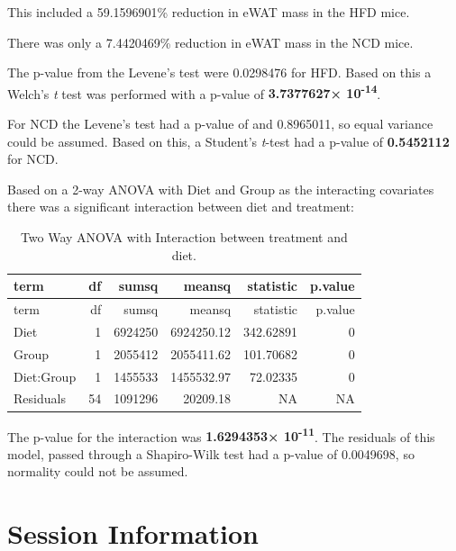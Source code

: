 \documentclass[]{article}
\begin{document}
This included a 59.1596901\% reduction in eWAT mass in the HFD mice.

There was only a 7.4420469\% reduction in eWAT mass in the NCD mice.

The p-value from the Levene's test were 0.0298476 for HFD. Based on this
a Welch's \emph{t} test was performed with a p-value of
\textbf{3.7377627× 10\textsuperscript{-14}}.

For NCD the Levene's test had a p-value of and 0.8965011, so equal
variance could be assumed. Based on this, a Student's \emph{t}-test had
a p-value of \textbf{0.5452112} for NCD.

Based on a 2-way ANOVA with Diet and Group as the interacting covariates
there was a significant interaction between diet and treatment:

\begin{longtable}[]{@{}lrrrrr@{}}
\caption{Two Way ANOVA with Interaction between treatment and
diet.}\tabularnewline
\toprule
term & df & sumsq & meansq & statistic & p.value\tabularnewline
\midrule
\endfirsthead
\toprule
term & df & sumsq & meansq & statistic & p.value\tabularnewline
\midrule
\endhead
Diet & 1 & 6924250 & 6924250.12 & 342.62891 & 0\tabularnewline
Group & 1 & 2055412 & 2055411.62 & 101.70682 & 0\tabularnewline
Diet:Group & 1 & 1455533 & 1455532.97 & 72.02335 & 0\tabularnewline
Residuals & 54 & 1091296 & 20209.18 & NA & NA\tabularnewline
\bottomrule
\end{longtable}

The p-value for the interaction was \textbf{1.6294353×
10\textsuperscript{-11}}. The residuals of this model, passed through a
Shapiro-Wilk test had a p-value of 0.0049698, so normality could not be
assumed.

\section{Session Information}\label{session-information}
\end{document}
